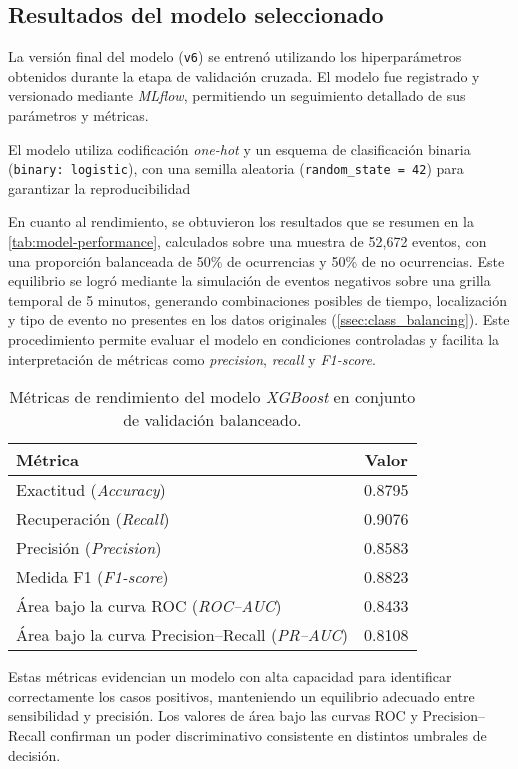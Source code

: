 \documentclass[12pt]{article}
\begin{document}
\subsection{Resultados del modelo seleccionado}

La versión final del modelo (\texttt{v6}) se entrenó utilizando los hiperparámetros obtenidos durante la etapa de validación cruzada. El modelo fue registrado y versionado mediante \textit{MLflow}, permitiendo un seguimiento detallado de sus parámetros y métricas.

El modelo utiliza codificación \textit{one-hot} y un esquema de clasificación binaria (\texttt{binary: logistic}), con una semilla aleatoria (\texttt{random\_state = 42}) para garantizar la reproducibilidad \parencite{geron2019hands}


\noindent En cuanto al rendimiento, se obtuvieron los resultados que se resumen en la \autoref{tab:model-performance}, calculados sobre una muestra de 52{,}672 eventos, con una proporción balanceada de 50\% de ocurrencias y 50\% de no ocurrencias.
Este equilibrio se logró mediante la simulación de eventos negativos sobre una grilla temporal de 5 minutos, generando combinaciones posibles de tiempo, localización y tipo de evento no presentes en los datos originales (\autoref{ssec:class_balancing}).
Este procedimiento permite evaluar el modelo en condiciones controladas y facilita la interpretación de métricas como \textit{precision}, \textit{recall} y \textit{F1-score}.

\begin{table}[H]
\centering
\caption{Métricas de rendimiento del modelo \textit{XGBoost} en conjunto de validación balanceado.}
\label{tab:model-performance}
\begin{tabular}{l c}
\toprule
\textbf{Métrica} & \textbf{Valor} \\
\midrule
Exactitud (\textit{Accuracy}) & 0.8795 \\
Recuperación (\textit{Recall}) & 0.9076 \\
Precisión (\textit{Precision}) & 0.8583 \\
Medida F1 (\textit{F1-score}) & 0.8823 \\
Área bajo la curva ROC (\textit{ROC–AUC}) & 0.8433 \\
Área bajo la curva Precision–Recall (\textit{PR–AUC}) & 0.8108 \\
\bottomrule
\end{tabular}
\end{table}

Estas métricas evidencian un modelo con alta capacidad para identificar correctamente los casos positivos, manteniendo un equilibrio adecuado entre sensibilidad y precisión.
Los valores de área bajo las curvas ROC y Precision–Recall confirman un poder discriminativo consistente en distintos umbrales de decisión.
\end{document}
